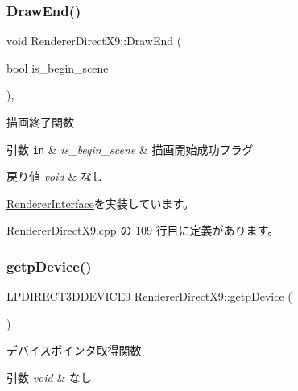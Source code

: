 \subsubsection{\texorpdfstring{Draw\+End()}{DrawEnd()}}
{\footnotesize\ttfamily void Renderer\+Direct\+X9\+::\+Draw\+End (\begin{DoxyParamCaption}\item[{bool}]{is\+\_\+begin\+\_\+scene }\end{DoxyParamCaption})\hspace{0.3cm}{\ttfamily [override]}, {\ttfamily [virtual]}}



描画終了関数 


\begin{DoxyParams}[1]{引数}
\mbox{\tt in}  & {\em is\+\_\+begin\+\_\+scene} & 描画開始成功フラグ \\
\hline
\end{DoxyParams}

\begin{DoxyRetVals}{戻り値}
{\em void} & なし \\
\hline
\end{DoxyRetVals}


\mbox{\hyperlink{class_renderer_interface_a0034a44420e4746062e70e4d66d3bee2}{Renderer\+Interface}}を実装しています。



 Renderer\+Direct\+X9.\+cpp の 109 行目に定義があります。

\mbox{\label{class_renderer_direct_x9_afabcea127b5af61e4d80564369e72baa}} 
\subsubsection{\texorpdfstring{getp\+Device()}{getpDevice()}}
{\footnotesize\ttfamily L\+P\+D\+I\+R\+E\+C\+T3\+D\+D\+E\+V\+I\+C\+E9 Renderer\+Direct\+X9\+::getp\+Device (\begin{DoxyParamCaption}{ }\end{DoxyParamCaption})}



デバイスポインタ取得関数 


\begin{DoxyParams}{引数}
{\em void} & なし \\
\hline
\end{DoxyParams}

